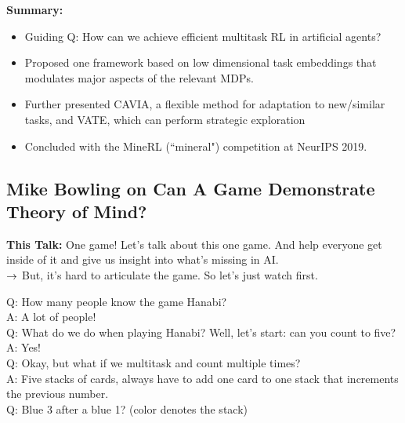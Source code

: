 {\bf Summary:}
\begin{itemize}
    \item Guiding Q: How can we achieve efficient multitask RL in artificial agents?
    \item Proposed one framework based on low dimensional task embeddings that modulates major aspects of the relevant MDPs.
    \item Further presented CAVIA, a flexible method for adaptation to new/similar tasks, and VATE, which can perform strategic exploration
    \item Concluded with the MineRL (``mineral") competition at NeurIPS 2019.
\end{itemize}

\spacerule

\subsection{Mike Bowling on Can A Game Demonstrate Theory of Mind?}

{\bf This Talk:} One game! Let's talk about this one game. And help everyone get inside of it and give us insight into what's missing in AI. \\

$\rightarrow$ But, it's hard to articulate the game. So let's just watch first. \\


Q: How many people know the game Hanabi? \\

A: A lot of people! \\

Q: What do we do when playing Hanabi? Well, let's start: can you count to five? \\

A: Yes! \\

Q: Okay, but what if we multitask and count multiple times? \\

A: Five stacks of cards, always have to add one card to one stack that increments the previous number. \\

Q: Blue 3 after a blue 1? (color denotes the stack) \\

